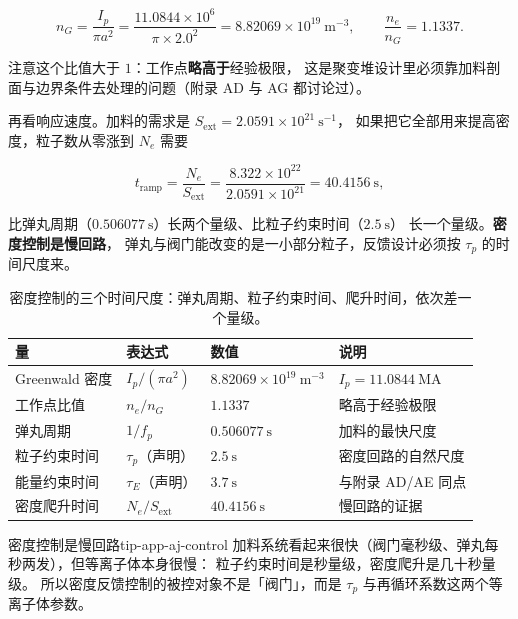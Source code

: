 \begin{equation}
n_G = \frac{I_p}{\pi a^{2}}
= \frac{11.0844\times10^{6}}{\pi\times2.0^{2}}
= 8.82069\times10^{19}\ \mathrm{m^{-3}},
\qquad
\frac{n_e}{n_G} = 1.1337 .
\label{eq:app-aj-greenwald}
\end{equation}

注意这个比值大于 $1$：工作点\textbf{略高于}经验极限，
这是聚变堆设计里必须靠加料剖面与边界条件去处理的问题（附录 AD 与 AG 都讨论过）。

再看响应速度。加料的需求是 $S_{\mathrm{ext}} = 2.0591\times10^{21}\ \mathrm{s^{-1}}$，
如果把它全部用来提高密度，粒子数从零涨到 $N_e$ 需要

\begin{equation}
t_{\mathrm{ramp}} = \frac{N_e}{S_{\mathrm{ext}}}
= \frac{8.322\times10^{22}}{2.0591\times10^{21}} = 40.4156\ \mathrm{s},
\label{eq:app-aj-ramp}
\end{equation}

比弹丸周期（$0.506077\ \mathrm{s}$）长两个量级、比粒子约束时间（$2.5\ \mathrm{s}$）
长一个量级。\textbf{密度控制是慢回路}，
弹丸与阀门能改变的是一小部分粒子，反馈设计必须按 $\tau_p$ 的时间尺度来。

\begin{table}[htbp]
\centering
\small
\caption{密度控制的三个时间尺度：弹丸周期、粒子约束时间、爬升时间，依次差一个量级。}
\label{tab:app-aj-control}
\begin{tabular}{p{3.4cm}p{3.0cm}p{3.0cm}p{3.4cm}}
\toprule
量 & 表达式 & 数值 & 说明 \\
\midrule
Greenwald 密度 & $I_p/(\pi a^{2})$ & $8.82069\times10^{19}\ \mathrm{m^{-3}}$ & $I_p = 11.0844\ \mathrm{MA}$ \\
工作点比值 & $n_e/n_G$ & $1.1337$ & 略高于经验极限 \\
弹丸周期 & $1/f_p$ & $0.506077\ \mathrm{s}$ & 加料的最快尺度 \\
粒子约束时间 & $\tau_p$（声明） & $2.5\ \mathrm{s}$ & 密度回路的自然尺度 \\
能量约束时间 & $\tau_E$（声明） & $3.7\ \mathrm{s}$ & 与附录 AD/AE 同点 \\
密度爬升时间 & $N_e/S_{\mathrm{ext}}$ & $40.4156\ \mathrm{s}$ & 慢回路的证据 \\
\bottomrule
\end{tabular}

\end{table}

\begin{tip}{密度控制是慢回路}{tip-app-aj-control}
加料系统看起来很快（阀门毫秒级、弹丸每秒两发），但等离子体本身很慢：
粒子约束时间是秒量级，密度爬升是几十秒量级。
所以密度反馈控制的被控对象不是「阀门」，而是 $\tau_p$ 与再循环系数这两个等离子体参数。
\end{tip}


